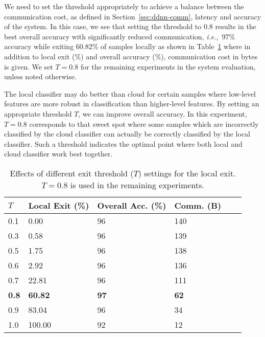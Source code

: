 \documentclass[10pt, conference, compsocconf]{IEEEtran}
\newcommand{\ie}{\emph{i.e.}}
\begin{document}
We need to set the threshold appropriately to achieve a balance between the communication cost, as defined in Section~\ref{sec:ddnn-comm}, latency and accuracy of the system. In this case, we see that setting the threshold to $0.8$ results in the best overall accuracy with significantly reduced communication, \ie,~97\% accuracy while exiting 60.82\% of samples locally as shown in Table~\ref{tab:threshold} where in addition to local exit (\%) and overall accuracy (\%), communication cost in bytes is given. We set $T=0.8$ for the remaining experiments in the system evaluation, unless noted otherwise. 


The local classifier may do better than cloud for certain samples where low-level features are more robust in classification than higher-level features. By setting an appropriate threshold $T$, we can improve overall accuracy. In this experiment, $T=0.8$ corresponds to that sweet spot where some samples which are incorrectly classified by the cloud classifier can actually be correctly classified by the local classifier. Such a threshold indicates the optimal point where both local and cloud classifier work best together.





\begin{table}[H]
\centering
\caption{Effects of different exit threshold ($T$) settings for the local exit. $T=0.8$ is used in the remaining experiments.}
\label{tab:threshold}
\begin{tabular}{|l|l|l|l|l|l|}
\hline
\textbf{$T$} & \textbf{Local Exit (\%)} & \textbf{Overall Acc. (\%)} & \textbf{Comm. (B)}\\
\hline
    0.1   & 0.00    &  96  &                            140           \\
    0.3   & 0.58    &  96  &                            139           \\
    0.5   & 1.75    &  96  &                            138           \\
    0.6   & 2.92    &  96  &                            136           \\
    0.7   & 22.81   &  96  &                            111           \\
    \textbf{0.8}   & \textbf{60.82}   &  \textbf{97}  & \textbf{62}  \\
    0.9   & 83.04   &  96  &                            34           \\
    1.0   & 100.00  &  92  &                            12          \\
\hline
\end{tabular}
\end{table}
\end{document}
